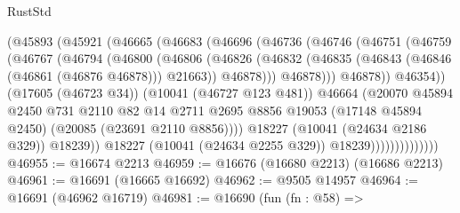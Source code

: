 \begin{lexlean}{RustStd}
\begin{coremodule}
                            (@45893
                              (@45921
                                (@46665
                                  (@46683
                                    (@46696
                                      (@46736
                                        (@46746
                                          (@46751
                                            (@46759
                                              (@46767
                                                (@46794
                                                  (@46800
                                                    (@46806
                                                      (@46826
                                                        (@46832
                                                          (@46835
                                                            (@46843
                                                              (@46846 (@46861 (@46876 @46878)))
                                                              @21663))
                                                          @46878)))
                                                    @46878)))
                                              @46878))
                                          @46354))
                                      (@17605 (@46723 @34))
                                      (@10041 (@46727 @123 @481))
                                      @46664
                                      (@20070
                                        @45894
                                        @2450
                                        @731
                                        @2110
                                        @82
                                        @14
                                        @2711
                                        @2695
                                        @8856
                                        @19053
                                        (@17148 @45894 @2450)
                                        (@20085 (@23691 @2110 @8856))))
                                    @18227
                                    (@10041 (@24634 @2186 @329))
                                    @18239))
                                @18227
                                (@10041 (@24634 @2255 @329))
                                @18239))))))))))))))
@46955 := @16674 @2213
@46959 := @16676 (@16680 @2213) (@16686 @2213)
@46961 := @16691 (@16665 @16692)
@46962 := @9505 @14957
@46964 := @16691 (@46962 @16719)
@46981 := @16690
    (fun (fn : @58) =>

\end{coremodule}
\end{lexlean}
